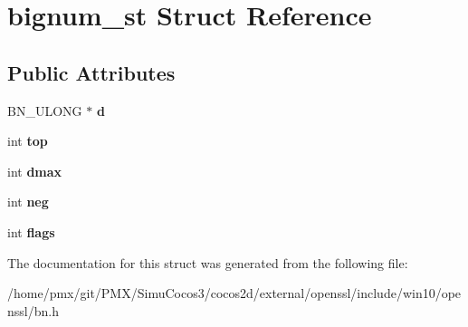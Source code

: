 \hypertarget{structbignum__st}{}\section{bignum\+\_\+st Struct Reference}
\label{structbignum__st}
\subsection*{Public Attributes}
\begin{DoxyCompactItemize}
\item 
\mbox{\label{structbignum__st_afa4e4a2eb24f9c3df7eb33fd589cba31}} 
B\+N\+\_\+\+U\+L\+O\+NG $\ast$ {\bfseries d}
\item 
\mbox{\label{structbignum__st_acb2587e7e0ff144adee978acd5b362f6}} 
int {\bfseries top}
\item 
\mbox{\label{structbignum__st_adc321f2d3b6d3962fda140080275267c}} 
int {\bfseries dmax}
\item 
\mbox{\label{structbignum__st_a4bffe6c6b7a0f7fa9821b0339b7d126f}} 
int {\bfseries neg}
\item 
\mbox{\label{structbignum__st_a7ab1fc90f994e4428dbf1f354cbc82b4}} 
int {\bfseries flags}
\end{DoxyCompactItemize}


The documentation for this struct was generated from the following file\+:\begin{DoxyCompactItemize}
\item 
/home/pmx/git/\+P\+M\+X/\+Simu\+Cocos3/cocos2d/external/openssl/include/win10/openssl/bn.\+h\end{DoxyCompactItemize}
